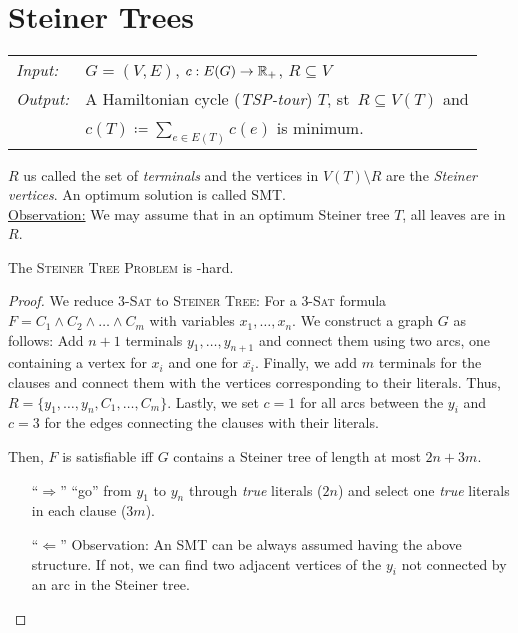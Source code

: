 \documentclass[../skript.tex]{subfiles}
\begin{document}
\chapter{Steiner Trees} %
\label{sec:c5}
\begin{problem}
\begin{tabular}{@{}ll}
\textit{Input:} & $G = (V, E)$, $c : E(G) \to \mathbb{R}_+$, $R \subseteq V$ \\
\textit{Output:} & A Hamiltonian cycle (\emph{TSP-tour}) $T$, \ac{st}\ $R \subseteq V(T)$ and \\
& $c(T) \coloneqq \sum_{e \in E(T)} c(e)$ is minimum.
\end{tabular}
\end{problem}
$R$ us called the set of \emph{terminals} and the vertices in $V(T) \setminus R$ are the \emph{Steiner vertices}. An optimum solution is called \ac{SMT}. \\
\underline{Observation:} We may assume that in an optimum Steiner tree $T$, all leaves are in $R$.
\begin{theorem} %
\label{thm:61}
The \textsc{Steiner Tree Problem} is \NP-hard.
\end{theorem}
\begin{proof}
We reduce \textsc{3-Sat} to \textsc{Steiner Tree}:
For a \textsc{3-Sat} formula $F = C_1 \wedge C_2 \wedge \ldots \wedge C_m$ with variables $x_1, \ldots, x_n$.
We construct a graph $G$ as follows: Add $n+1$ terminals $y_1, \ldots, y_{n+1}$ and connect them using two arcs, one containing a vertex for $x_i$ and one for $\overline{x_i}$. Finally, we add $m$ terminals for the clauses and connect them with the vertices corresponding to their literals. Thus, $R = \{ y_1, \ldots, y_n, C_1, \ldots, C_m\}$. Lastly, we set $c = 1$ for all arcs between the $y_i$ and $c = 3$ for the edges connecting the clauses with their literals.

Then, $F$ is satisfiable \ac{iff} $G$ contains a Steiner tree of length at most $2n + 3m$.
\begin{itemize}
\item[``$\Rightarrow$''] ``go'' from $y_1$ to $y_n$ through \textit{true} literals ($2n$) and select one \textit{true} literals in each clause ($3m$).
\item[``$\Leftarrow$''] Observation: An \ac{SMT} can be always assumed having the above structure. If not, we can find two adjacent vertices of the $y_i$ not connected by an arc in the Steiner tree.
\end{itemize}
\end{proof}
\end{document}
